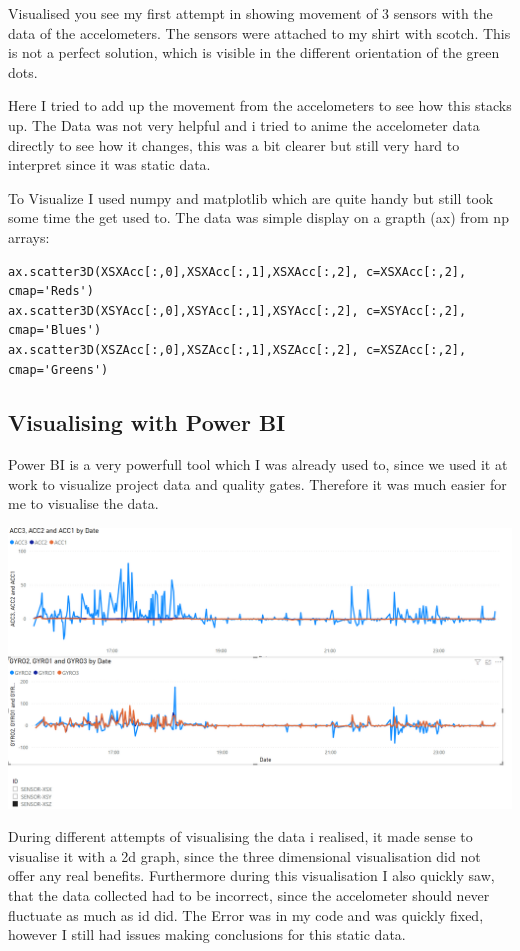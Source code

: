 Visualised you see my first attempt in showing movement of 3 sensors with the data of the accelometers. The sensors were attached to my shirt with scotch. This is not a perfect solution, which is visible in the different orientation of the green dots. 

Here I tried to add up the movement from the accelometers to see how this stacks up. The Data was not very helpful and i tried to anime the accelometer data directly to see how it changes, this was a bit clearer but still very hard to interpret since it was static data. 

To Visualize I used numpy and matplotlib which are quite handy but still took some time the get used to.
The data was simple display on a grapth (ax) from np arrays:

\begin{lstlisting}
ax.scatter3D(XSXAcc[:,0],XSXAcc[:,1],XSXAcc[:,2], c=XSXAcc[:,2], cmap='Reds')
ax.scatter3D(XSYAcc[:,0],XSYAcc[:,1],XSYAcc[:,2], c=XSYAcc[:,2], cmap='Blues')
ax.scatter3D(XSZAcc[:,0],XSZAcc[:,1],XSZAcc[:,2], c=XSZAcc[:,2], cmap='Greens')
\end{lstlisting}

\subsection{Visualising with Power BI}

Power BI is a very powerfull tool which I was already used to, since we used it at work to visualize project data and quality gates. Therefore it was much easier for me to visualise the data.

\includegraphics[width=\linewidth]{images/PowerBIVisualisiation.png}

During different attempts of visualising the data i realised, it made sense to visualise it with a 2d graph, since the three dimensional visualisation did not offer any real benefits. Furthermore during this visualisation I also quickly saw, that the data collected had to be incorrect, since the accelometer should never fluctuate as much as id did. The Error was in my code and was quickly fixed, however I still had issues making conclusions for this static data.

